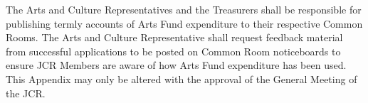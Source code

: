 \npara The Arts and Culture Representatives and the Treasurers shall be responsible for publishing termly accounts of Arts Fund expenditure to their respective Common Rooms. The Arts and Culture Representative shall request feedback material from successful applications to be posted on Common Room noticeboards to ensure JCR Members are aware of how Arts Fund expenditure has been used.   
\npara This Appendix may only be altered with the approval of the General Meeting of the JCR.  
